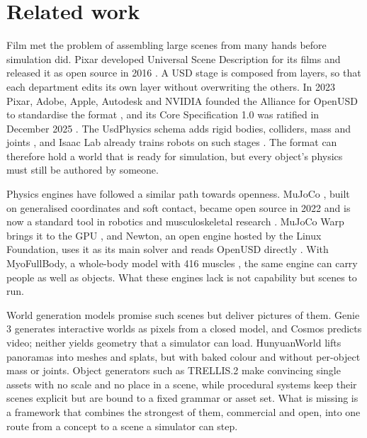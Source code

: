 \section{Related work}\label{related-work}

Film met the problem of assembling large scenes from many hands before simulation did. Pixar developed Universal Scene Description for its films and released it as open source in 2016 \citep{openusd, pixar2016usd}. A USD stage is composed from layers, so that each department edits its own layer without overwriting the others. In 2023 Pixar, Adobe, Apple, Autodesk and NVIDIA founded the Alliance for OpenUSD to standardise the format \citep{aousd2023}, and its Core Specification 1.0 was ratified in December 2025 \citep{aousd2025corespec}. The UsdPhysics schema adds rigid bodies, colliders, mass and joints \citep{usdphysics}, and Isaac Lab already trains robots on such stages \citep{mittal2025isaaclab}. The format can therefore hold a world that is ready for simulation, but every object's physics must still be authored by someone.

Physics engines have followed a similar path towards openness. MuJoCo \citep{todorov2012mujoco}, built on generalised coordinates and soft contact, became open source in 2022 \citep{mujocorepo} and is now a standard tool in robotics and musculoskeletal research \citep{caggiano2022myosuite}. MuJoCo Warp brings it to the GPU \citep{mujocowarp, warp}, and Newton, an open engine hosted by the Linux Foundation, uses it as its main solver and reads OpenUSD directly \citep{newton}. With MyoFullBody, a whole-body model with 416 muscles \citep{li2026musclemimic}, the same engine can carry people as well as objects. What these engines lack is not capability but scenes to run.

World generation models promise such scenes but deliver pictures of them. Genie 3 \citep{genie3} generates interactive worlds as pixels from a closed model, and Cosmos \citep{agarwal2025cosmos} predicts video; neither yields geometry that a simulator can load. HunyuanWorld \citep{hunyuanworld2025, hyworld2} lifts panoramas into meshes and splats, but with baked colour and without per-object mass or joints. Object generators such as TRELLIS.2 \citep{xiang2025trellis2} make convincing single assets with no scale and no place in a scene, while procedural systems \citep{raistrick2023infinigen, raistrick2024indoors, yang2024holodeck} keep their scenes explicit but are bound to a fixed grammar or asset set. What is missing is a framework that combines the strongest of them, commercial and open, into one route from a concept to a scene a simulator can step.
